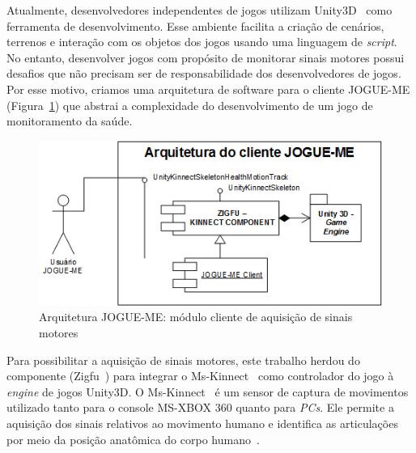 Atualmente, desenvolvedores independentes de jogos utilizam Unity3D~\cite{unity3d} como ferramenta de desenvolvimento. Esse ambiente facilita a criação de cenários, terrenos e interação com os objetos dos jogos usando uma linguagem de \textit{script}. No entanto, desenvolver jogos com propósito de monitorar sinais motores possui desafios que não precisam ser de responsabilidade dos desenvolvedores de jogos. Por esse motivo, criamos uma arquitetura de software para o cliente JOGUE-ME (Figura~\ref{fig:arquitetura_cliente}) que abstrai a complexidade do desenvolvimento de um jogo de monitoramento da saúde.

\begin{figure}[!htbp]
 \centering
 \includegraphics[scale=0.8]{./img/arquiclientejogueme.png}
\caption{Arquitetura JOGUE-ME: módulo cliente de aquisição de sinais motores}
 \label{fig:arquitetura_cliente}
\end{figure}


Para possibilitar a aquisição de sinais motores, este trabalho herdou do componente (Zigfu~\cite{zigfu}) para integrar o Ms-Kinnect~\cite{kinnect2013} como controlador do jogo à \textit{engine} de jogos Unity3D. O Ms-Kinnect~\cite{kinnect2013} é um sensor de captura de movimentos utilizado tanto para o console MS-XBOX 360 quanto para \textit{PCs}. Ele permite a aquisição dos sinais relativos ao movimento humano e identifica as articulações por meio da posição anatômica do corpo humano~\cite{hamill1999bases}.





